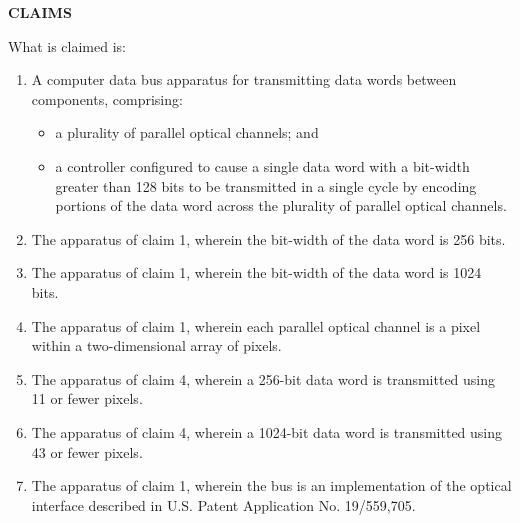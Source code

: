 \documentclass[11pt,letterpaper]{article}
\begin{document}
\thispagestyle{empty}

\begin{center}
    \textbf{\large CLAIMS}
\end{center}

\vspace{0.4cm}
\noindent What is claimed is:

\begin{enumerate}[label=\textbf{\arabic*.}, leftmargin=0.5in, itemsep=0.4cm]
    \item A computer data bus apparatus for transmitting data words between components, comprising:
    \begin{itemize}[leftmargin=0.3in, noitemsep]
        \item a plurality of parallel optical channels; and
        \item a controller configured to cause a single data word with a bit-width greater than 128 bits to be transmitted in a single cycle by encoding portions of the data word across the plurality of parallel optical channels.
    \end{itemize}

    \item The apparatus of claim 1, wherein the bit-width of the data word is 256 bits.

    \item The apparatus of claim 1, wherein the bit-width of the data word is 1024 bits.

    \item The apparatus of claim 1, wherein each parallel optical channel is a pixel within a two-dimensional array of pixels.

    \item The apparatus of claim 4, wherein a 256-bit data word is transmitted using 11 or fewer pixels.

    \item The apparatus of claim 4, wherein a 1024-bit data word is transmitted using 43 or fewer pixels.

    \item The apparatus of claim 1, wherein the bus is an implementation of the optical interface described in U.S. Patent Application No. 19/559,705.
\end{enumerate}
\end{document}
